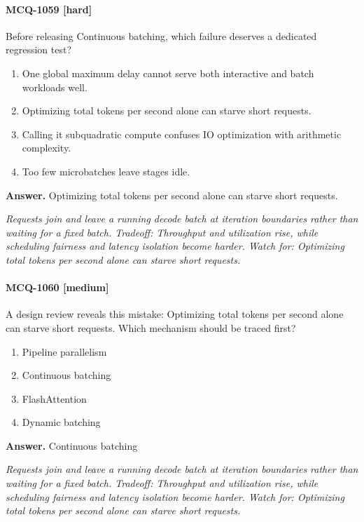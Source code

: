 \paragraph{MCQ-1059 [hard]} Before releasing Continuous batching, which failure deserves a dedicated regression test?
\begin{enumerate}[label=\Alph*.]
\item One global maximum delay cannot serve both interactive and batch workloads well.
\item Optimizing total tokens per second alone can starve short requests.
\item Calling it subquadratic compute confuses IO optimization with arithmetic complexity.
\item Too few microbatches leave stages idle.
\end{enumerate}
\noindent\textbf{Answer.} Optimizing total tokens per second alone can starve short requests.
\par\textit{Requests join and leave a running decode batch at iteration boundaries rather than waiting for a fixed batch. Tradeoff: Throughput and utilization rise, while scheduling fairness and latency isolation become harder. Watch for: Optimizing total tokens per second alone can starve short requests.}
\paragraph{MCQ-1060 [medium]} A design review reveals this mistake: Optimizing total tokens per second alone can starve short requests. Which mechanism should be traced first?
\begin{enumerate}[label=\Alph*.]
\item Pipeline parallelism
\item Continuous batching
\item FlashAttention
\item Dynamic batching
\end{enumerate}
\noindent\textbf{Answer.} Continuous batching
\par\textit{Requests join and leave a running decode batch at iteration boundaries rather than waiting for a fixed batch. Tradeoff: Throughput and utilization rise, while scheduling fairness and latency isolation become harder. Watch for: Optimizing total tokens per second alone can starve short requests.}
